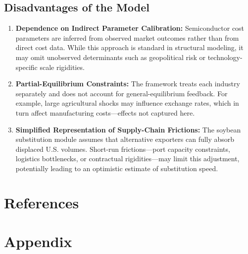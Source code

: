 \documentclass{apmcmthesis}
\begin{document}
\subsection{Disadvantages of the Model}
\begin{enumerate}
    \item \textbf{Dependence on Indirect Parameter Calibration:}
    Semiconductor cost parameters are inferred from observed market outcomes rather than from direct cost data. 
    While this approach is standard in structural modeling, it may omit unobserved determinants such as geopolitical risk 
    or technology-specific scale rigidities.

    \item \textbf{Partial-Equilibrium Constraints:}
    The framework treats each industry separately and does not account for general-equilibrium feedback. 
    For example, large agricultural shocks may influence exchange rates, which in turn affect manufacturing costs—effects not captured here.

    \item \textbf{Simplified Representation of Supply-Chain Frictions:}
    The soybean substitution module assumes that alternative exporters can fully absorb displaced U.S. volumes. 
    Short-run frictions—port capacity constraints, logistics bottlenecks, or contractual rigidities—may limit this adjustment, 
    potentially leading to an optimistic estimate of substitution speed.
\end{enumerate}

\newpage


\section*{References}






\newpage
\section*{Appendix}
\end{document}
